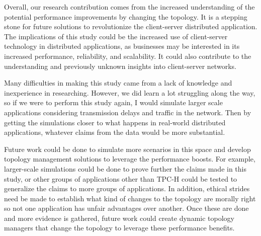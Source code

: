 Overall, our research contribution comes from the increased understanding of the potential performance improvements by changing the topology. It is a stepping stone for future solutions to revolutionize the client-server distributed application. The implications of this study could be the increased use of client-server technology in distributed applications, as businesses may be interested in its increased performance, reliability, and scalability. It could also contribute to the understanding and previously unknown insights into client-server networks.

	Many difficulties in making this study came from a lack of knowledge and inexperience in researching. However, we did learn a lot struggling along the way, so if we were to perform this study again, I would simulate larger scale applications considering transmission delays and traffic in the network. Then by getting the simulations closer to what happens in real-world distributed applications, whatever claims from the data would be more substantial.

Future work could be done to simulate more scenarios in this space and develop topology management solutions to leverage the performance boosts. For example, larger-scale simulations could be done to prove further the claims made in this study, or other groups of applications other than TPC-H could be tested to generalize the claims to more groups of applications. In addition, ethical strides need be made to establish what kind of changes to the topology are morally right so not one application has unfair advantages over another. Once these are done and more evidence is gathered, future work could create dynamic topology managers that change the topology to leverage these performance benefits.






